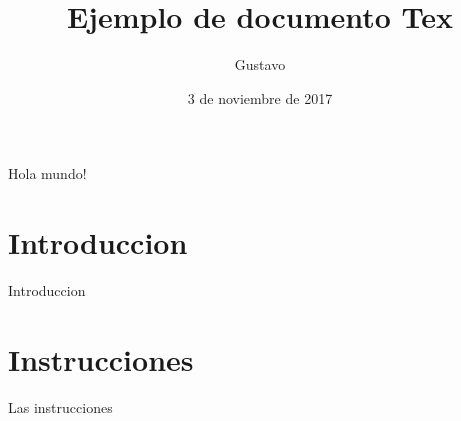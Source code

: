\documentclass[10pt,a4paper]{article}
\title{Ejemplo de documento Tex}
\author{Gustavo}
\date{3 de noviembre de 2017}
\begin{document}
\maketitle
	Hola mundo!
\section{Introduccion}
Introduccion
\section{Instrucciones}
	Las instrucciones	
\end{document}
